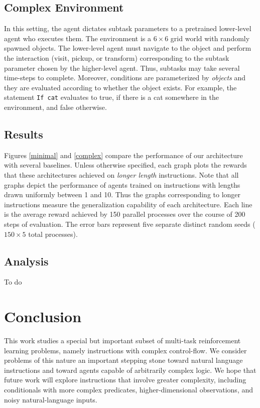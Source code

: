 \documentclass{article}
\begin{document}
\subsection{Complex Environment}
In this setting, the agent dictates subtask parameters to a pretrained
lower-level agent who executes them. The environment is a $6\times 6$ grid world
with randomly spawned objects. The lower-level agent must navigate to the object
and perform the interaction (visit, pickup, or transform) corresponding to the
subtask parameter chosen by the higher-level agent. Thus, subtasks may take several time-steps to
complete. Moreover, conditions are parameterized by \textit{objects} and they
are evaluated according to whether the object exists. For example, the statement
\texttt{If cat} evaluates to true, if there is a cat somewhere in the
environment, and false otherwise.


\subsection{Results}
\label{results}
Figures \ref{minimal} and \ref{complex} compare the performance of our
architecture with several baselines. 
Unless otherwise specified, each graph plots the rewards that these architectures achieved on \textit{longer
length} instructions.
 Note that all graphs depict the performance of agents trained on instructions with lengths drawn uniformly between 1 and 10. Thus
the graphs corresponding to longer instructions measure the generalization capability of each architecture. Each
line is the average reward achieved by 150 parallel processes over the course of
200 steps of evaluation. The error bars represent five separate distinct random
seeds ($150 \times 5$ total processes).

\subsection{Analysis}
To do

\section{Conclusion}
This work studies a special but important subset of multi-task reinforcement
learning problems, namely instructions with complex control-flow. We consider
problems of this nature an important stepping stone toward natural language
instructions and toward agents capable of arbitrarily complex logic. We hope
that future work will explore instructions that involve greater complexity,
including conditionals with more complex predicates, higher-dimensional
observations, and noisy natural-language inputs.
\end{document}
